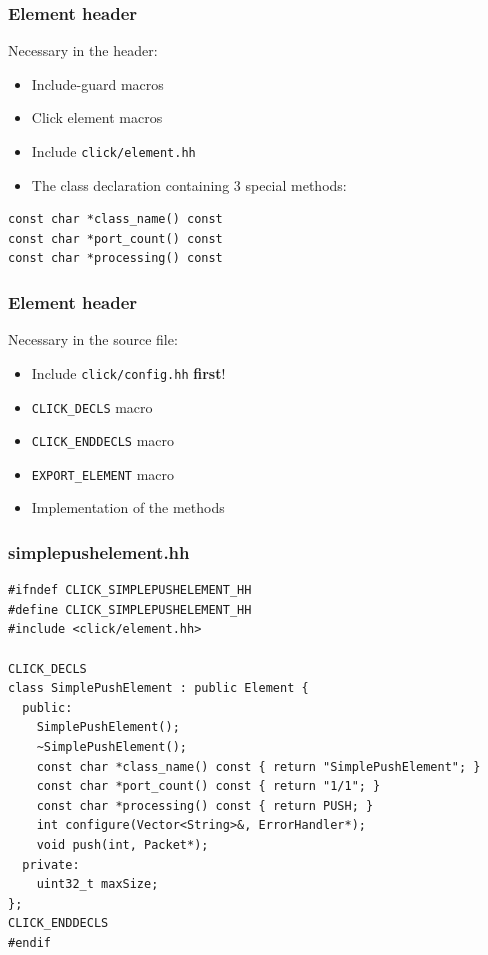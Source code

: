 \documentclass{beamer}
\begin{document}
\begin{frame}[fragile]
\frametitle{Element header}
Necessary in the header:
\begin{itemize}
	\item Include-guard macros
	\item Click element macros
	\item Include \verb!click/element.hh!
	\item The class declaration containing 3 special methods:
\end{itemize}
\begin{lstlisting}
const char *class_name() const
const char *port_count() const
const char *processing() const
\end{lstlisting}
\end{frame}

\begin{frame}[fragile]
\frametitle{Element header}
Necessary in the source file:
\begin{itemize}
	\item Include \verb!click/config.hh! \textbf{first}!
	\item \verb!CLICK_DECLS! macro
	\item \verb!CLICK_ENDDECLS! macro
	\item \verb!EXPORT_ELEMENT! macro
	\item Implementation of the methods
\end{itemize}
\end{frame}

\begin{frame}[fragile]
\frametitle{simplepushelement.hh}
\begin{lstlisting}[basicstyle=\tiny\ttfamily]
#ifndef CLICK_SIMPLEPUSHELEMENT_HH
#define CLICK_SIMPLEPUSHELEMENT_HH
#include <click/element.hh>

CLICK_DECLS
class SimplePushElement : public Element { 
  public:
    SimplePushElement();
    ~SimplePushElement();
    const char *class_name() const { return "SimplePushElement"; }
    const char *port_count() const { return "1/1"; }
    const char *processing() const { return PUSH; }
    int configure(Vector<String>&, ErrorHandler*);
    void push(int, Packet*);
  private:
    uint32_t maxSize;
};
CLICK_ENDDECLS
#endif
\end{lstlisting}
\end{frame}
\end{document}
